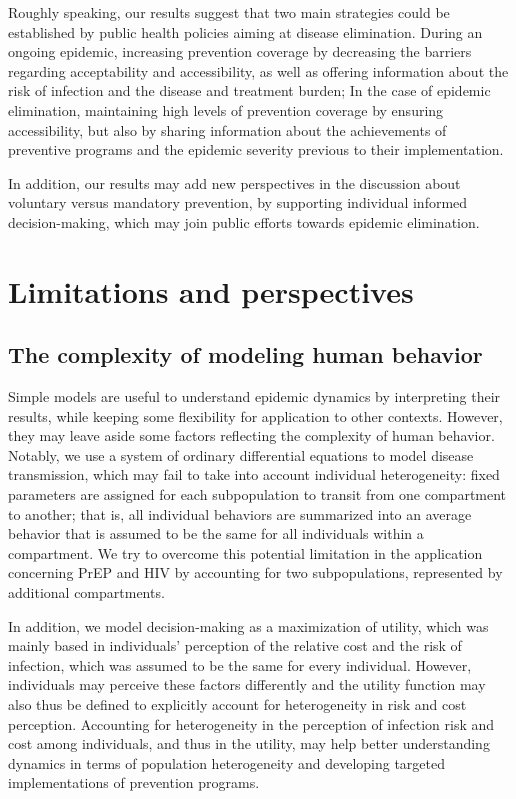 Roughly speaking, our results suggest that two main strategies could be established by public health policies aiming at disease elimination. During an ongoing epidemic, increasing prevention coverage by decreasing the barriers regarding acceptability and accessibility, as well as offering information about the risk of infection and the disease and treatment burden; In the case of epidemic elimination, maintaining high levels of prevention coverage by ensuring accessibility, but also by sharing information about  the achievements of preventive programs and the epidemic severity previous to their implementation. 

In addition, our results may add new perspectives in the discussion about voluntary versus mandatory prevention, by supporting individual informed decision-making, which may join public efforts towards epidemic elimination.

\section{Limitations and perspectives}

\subsection{The complexity of modeling human behavior}
Simple models are useful to understand epidemic dynamics by interpreting their results, while keeping some flexibility for application to other contexts. However, they may leave aside some factors reflecting the complexity of human behavior. Notably, we use a system of ordinary differential equations to model disease transmission, which may fail to take into account individual heterogeneity: fixed parameters are assigned for each subpopulation to transit from one compartment to another; that is, all individual behaviors are summarized into an average behavior that is assumed to be the same for all individuals within a compartment. We try to overcome this potential limitation in the application concerning PrEP and HIV by accounting for two subpopulations, represented by additional compartments. 

In addition, we model decision-making as a maximization of utility, which was mainly based in individuals' perception of the relative cost and the risk of infection, which was assumed to be the same for every individual. However, individuals may perceive these factors differently and the utility function may also thus be defined to explicitly account for heterogeneity in risk and cost perception. Accounting for heterogeneity in the perception of infection risk and cost among individuals, and thus in the utility, may help better understanding dynamics in terms of population heterogeneity and developing targeted implementations of prevention programs.

